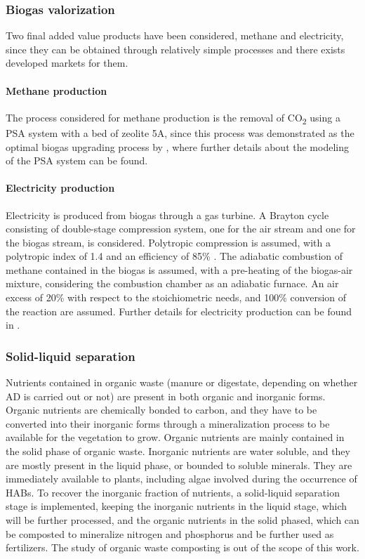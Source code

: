 \documentclass[authoryear]{elsarticle}
\begin{document}
\subsubsection{Biogas valorization}
Two final added value products have been considered, methane and electricity, since they can be obtained through relatively simple processes and there exists developed markets for them.

\paragraph{Methane production}
The process considered for methane production is the removal of CO\textsubscript{2} using a PSA system with a bed of zeolite 5A, since this process was demonstrated as the optimal biogas upgrading process by \citet{MartinHernandez2020}, where further details about the modeling of the PSA system can be found.

\paragraph{Electricity production}
Electricity is produced from biogas through a gas turbine. A Brayton cycle consisting of double-stage compression system, one for the air stream and one for the biogas stream, is considered. Polytropic compression is assumed, with a polytropic index of 1.4 and an efficiency of 85\% \citep{moran2010fundamentals}. The adiabatic combustion of methane contained in the biogas is assumed, with a pre-heating of the biogas-air mixture, considering the combustion chamber as an adiabatic furnace. An air excess of 20\% with respect to the stoichiometric needs, and 100\% conversion of the reaction are assumed. Further details for electricity production can be found in \citet{MartinHernandez}.

\subsubsection{Solid-liquid separation}
Nutrients contained in organic waste (manure or digestate, depending on whether AD is carried out or not) are present in both organic and inorganic forms. Organic nutrients are chemically bonded to carbon, and they have to be converted into their inorganic forms through a mineralization process to be available for the vegetation to grow. Organic nutrients are mainly contained in the solid phase of organic waste. Inorganic nutrients are water soluble, and they are mostly present in the liquid phase, or bounded to soluble minerals. They are immediately available to plants, including algae involved during the occurrence of HABs. To recover the inorganic fraction of nutrients, a solid-liquid separation stage is implemented, keeping the inorganic nutrients in the liquid stage, which will be further processed, and the organic nutrients in the solid phased, which can be composted to mineralize nitrogen and phosphorus and be further used as fertilizers. The study of organic waste composting is out of the scope of this work.
\end{document}
